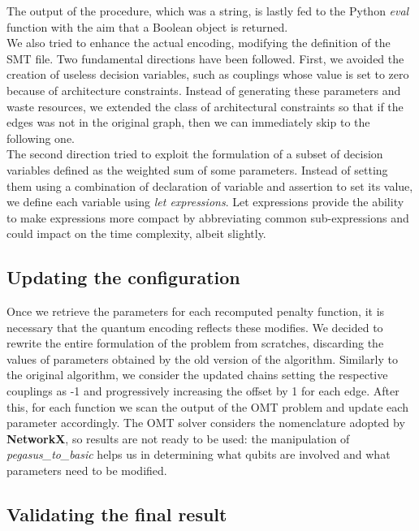 The output of the procedure, which was a string, is lastly fed to the Python \textit{eval} function with the aim that a Boolean object is returned. \\
We also tried to enhance the actual encoding, modifying the definition of the SMT file. Two fundamental directions have been followed. First, we avoided the creation of useless decision variables, such as couplings whose value is set to zero because of architecture constraints. Instead of generating these parameters and waste resources, we extended the class of architectural constraints so that if the edges was not in the original graph, then we can immediately skip to the following one. \\
The second direction tried to exploit the formulation of a subset of decision variables defined as the weighted sum of some parameters. Instead of setting them using a combination of declaration of variable and assertion to set its value, we define each variable using \textit{let expressions}. Let expressions provide the ability to make expressions more compact by
abbreviating common sub-expressions and could impact on the time complexity, albeit slightly.

\subsection{Updating the configuration}

Once we retrieve the parameters for each recomputed penalty function, it is necessary that the quantum encoding reflects these modifies. We decided to rewrite the entire formulation of the problem from scratches, discarding the values of parameters obtained by the old version of the algorithm. Similarly to the original algorithm, we consider the updated chains setting the respective couplings as -1 and progressively increasing the offset by 1 for each edge. After this, for each function we scan the output of the OMT problem and update each parameter accordingly. The OMT solver considers the nomenclature adopted by \textbf{NetworkX}, so results are not ready to be used: the manipulation of \textit{pegasus\_to\_basic} helps us in determining what qubits are involved and what parameters need to be modified. 

\subsection{Validating the final result}

